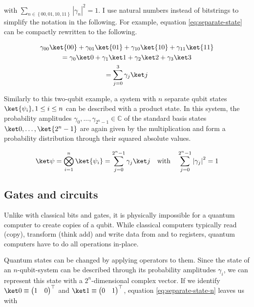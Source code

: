 with $\sum_{n \in \left\{00, 01, 10, 11\right\}} \left|\gamma_n\right|^2 = 1$.
I use natural numbers instead of bitstrings to simplify the notation in the
following.
For example, equation \ref{eq:separate-state} can be compactly rewritten to the
following.

\begin{equation}
    \label{eq:separate-state-natural-numbers}
    \begin{gathered}
            \gamma_{00} \ket{00} + \gamma_{01} \ket{01} + \gamma_{10} \ket{10} + \gamma_{11} \ket{11}\\
        =   \gamma_0 \ket 0 + \gamma_1 \ket 1 + \gamma_2 \ket 2 + \gamma_3 \ket 3\\
        =   \sum_{j=0}^3 \gamma_j \ket j
    \end{gathered}
\end{equation}

Similarly to this two-qubit example, a system with $n$ separate qubit states
$\ket{\psi_i}, 1 \leq i \leq n$ can be described with a product state.
In this system, the probability amplitudes
$\gamma_0, \dots, \gamma_{2^n -1} \in \mathbb C$ of the standard basis states
$\ket 0, \dots, \ket{2^n -1}$ are again given by the multiplication and form a
probability distribution through their squared absolute values.

\begin{equation}
    \label{eq:separate-state-n}
    \ket\psi = \bigotimes_{i=1}^n \ket{\psi_i} = \sum_{j=0}^{2^n -1} \gamma_j \ket j
        \quad\text{with}\quad \sum_{j=0}^{2^n -1} \left|\gamma_j\right|^2 = 1
\end{equation}

\subsection{Gates and circuits}

Unlike with classical bits and gates, it is physically impossible for a quantum
computer to create copies of a qubit.
While classical computers typically read (copy), transform (think add) and write
data from and to registers, quantum computers have to do all operations
in-place.

Quantum states can be changed by applying operators to them.
Since the state of an $n$-qubit-system can be described through its probability
amplitudes $\gamma_i$, we can represent this state with a $2^n$-dimensional
complex vector.
If we identify $\ket 0 \equiv \begin{pmatrix}1 & 0\end{pmatrix}^\top$ and
$\ket 1 \equiv \begin{pmatrix}0 & 1\end{pmatrix}^\top$,
equation \ref{eq:separate-state-n} leaves us with

